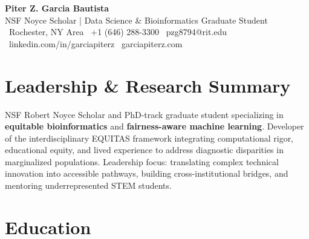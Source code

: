 \documentclass[10pt]{article}
\begin{document}

\begin{center}
    {\Huge \textbf{Piter Z. Garcia Bautista}} \\
    \vspace{5pt}
    {\Large NSF Noyce Scholar | Data Science \& Bioinformatics Graduate Student} \\
    \vspace{5pt}
    \faMapMarker* \, Rochester, NY Area \quad
    \faPhone \, +1 (646) 288-3300 \quad
    \faEnvelope \, pzg8794@rit.edu \\
    \faLinkedin \, linkedin.com/in/garciapiterz \quad
    \faGlobe \, garciapiterz.com
\end{center}


\section{Leadership \& Research Summary}
\vspace{-5pt}
NSF Robert Noyce Scholar and PhD-track graduate student specializing in \textbf{equitable bioinformatics} and \textbf{fairness-aware machine learning}. Developer of the interdisciplinary EQUITAS framework integrating computational rigor, educational equity, and lived experience to address diagnostic disparities in marginalized populations. Leadership focus: translating complex technical innovation into accessible pathways, building cross-institutional bridges, and mentoring underrepresented STEM students.


\section{Education}
\end{document}
